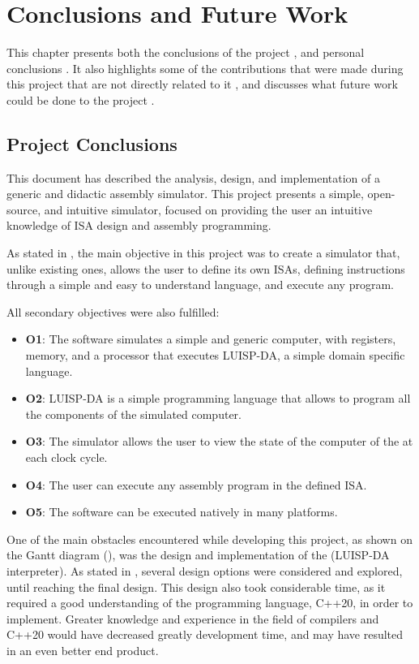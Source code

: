 \chapter{Conclusions and Future Work}\label{chap:conclusions}
This chapter presents both the conclusions of the project , and personal conclusions . It also highlights some of the contributions that were made during this project that are not directly related to it , and discusses what future work could be done to the project .


\section{Project Conclusions}\label{sec:project-conclusions}
This document has described the analysis, design, and implementation of a generic and didactic \gls{assembly} simulator. This project presents a simple, open-source, and intuitive simulator, focused on providing the user an intuitive knowledge of \gls{ISA} design and \gls{assembly} programming.

As stated in , the main objective in this project was to create a simulator that, unlike existing ones, allows the user to define its own \glspl{ISA}, defining instructions through a simple and easy to understand language, and execute any  program.

\noindent
All secondary objectives were also fulfilled:
\begin{itemize}
  \item \textbf{O1}: The software simulates a simple and generic computer, with \glspl{register}, \gls{memory}, and a processor that executes LUISP-DA, a simple domain specific language.
  \item \textbf{O2}: LUISP-DA is a simple \gls{programming language} that allows to program all the components of the simulated computer.
  \item \textbf{O3}: The simulator allows the user to view the state of the computer of the at each \gls{clock cycle}.
  \item \textbf{O4}: The user can execute any \gls{assembly} program in the defined \gls{ISA}.
  \item \textbf{O5}: The software can be executed natively in many platforms.
\end{itemize}

One of the main obstacles encountered while developing this project, as shown on the Gantt diagram (), was the design and implementation of the  (LUISP-DA interpreter). As stated in , several design options were considered and explored, until reaching the final design. This design also took considerable time, as it required a good understanding of the programming language, C++20, in order to implement. Greater knowledge and experience in the field of compilers and C++20 would have decreased greatly development time, and may have resulted in an even better end product.



